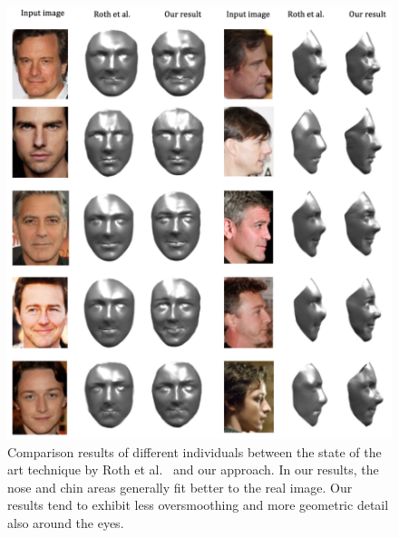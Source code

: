 \begin{figure}[tbp]
  \centering
  \includegraphics[width=.9\linewidth]{figures/all.png}
  \caption{\label{fig:all}%
           Comparison results of different individuals between the state of the art technique by Roth et al.~\cite{Roth:2015:UFR} and our approach. In our results, the nose and chin areas generally fit better to the real image. Our results tend to exhibit less oversmoothing and more geometric detail also around the eyes.
           \newline
  }
\end{figure}


